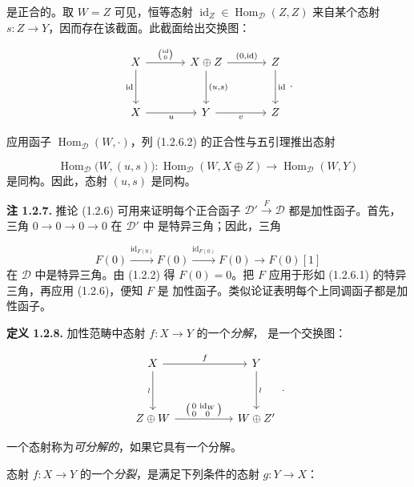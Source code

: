 \clearpage
{}%
\begingroup
\small
\setlength{\abovedisplayskip}{4pt plus 2pt minus 2pt}%
\setlength{\belowdisplayskip}{4pt plus 2pt minus 2pt}%

是正合的。取 $W=Z$ 可见，恒等态射
$\operatorname{id}_Z\in\operatorname{Hom}_{\mathcal D}(Z,Z)$ 来自某个态射
$s\colon Z\longrightarrow Y$，因而存在该截面。此截面给出交换图：

\begin{equation*}
  \begin{tikzcd}[column sep=3.5em,row sep=3.0em]
    X \arrow[r,"{\binom{\operatorname{id}}{0}}"]
      \arrow[d,"{\operatorname{id}}"']
      & X\oplus Z \arrow[r,"{(0,\operatorname{id})}"]
        \arrow[d,"{(u,s)}"]
      & Z \arrow[d,"{\operatorname{id}}"] \\
    X \arrow[r,"u"'] & Y \arrow[r,"v"'] & Z
  \end{tikzcd}\,.
\end{equation*}

应用函子 $\operatorname{Hom}_{\mathcal D}(W,\mathord\cdot)$，列
(1.2.6.2) 的正合性与五引理推出态射

\[
  \operatorname{Hom}_{\mathcal D}\bigl(W,(u,s)\bigr)\colon
  \operatorname{Hom}_{\mathcal D}(W,X\oplus Z)
  \longrightarrow \operatorname{Hom}_{\mathcal D}(W,Y)
\]
是同构。\space 因此，态射 $(u,s)$ 是同构。

\medskip
\noindent\textbf{注 1.2.7.}\quad
推论 (1.2.6) 可用来证明每个正合函子
$\mathcal D'\xrightarrow{F}\mathcal D$ 都是加性函子。首先，三角
$0\longrightarrow0\longrightarrow0\longrightarrow0$ 在 $\mathcal D'$ 中
是特异三角；因此，三角

\[
  F(0)\xrightarrow{\operatorname{id}_{F(0)}}F(0)
  \xrightarrow{\operatorname{id}_{F(0)}}F(0)
  \longrightarrow F(0)[1]
\]
在 $\mathcal D$ 中是特异三角。由 (1.2.2) 得 $F(0)=0$。把 $F$
应用于形如 (1.2.6.1) 的特异三角，再应用 (1.2.6)，便知 $F$ 是
加性函子。类似论证表明每个上同调函子都是加性函子。

\medskip
\noindent\textbf{定义 1.2.8.}\quad
加性范畴中态射 $f\colon X\longrightarrow Y$ 的一个\emph{分解}，
是一个交换图：

\begin{equation*}
  \begin{tikzcd}[ampersand replacement=\&,column sep=5.2em,row sep=3.4em]
    X \arrow[r,"f"] \arrow[d,"\wr"']
      \& Y \arrow[d,"\wr"] \\
    Z\oplus W
      \arrow[r,"{\left(\begin{smallmatrix}0&\operatorname{id}_W\\0&0\end{smallmatrix}\right)}"]
      \& W\oplus Z'
  \end{tikzcd}\,.
\end{equation*}

一个态射称为\emph{可分解的}，如果它具有一个分解。

态射 $f\colon X\longrightarrow Y$ 的一个\emph{分裂}，是满足下列条件的态射
$g\colon Y\longrightarrow X$：
\endgroup
